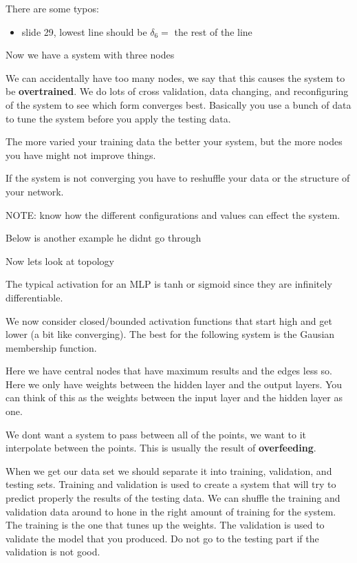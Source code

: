 \documentclass{article}
\begin{document}
There are some typos:
\begin{itemize}
	\item slide 29, lowest line should be $\delta_6 = $ the rest of the line
\end{itemize}





Now we have a system with three nodes

We can accidentally have too many nodes, we say that this causes the system to be \textbf{overtrained}. We do lots of cross validation, data changing, and reconfiguring of the system to see which form converges best. Basically you use a bunch of data to tune the system before you apply the testing data.

The more varied your training data the better your system, but the more nodes you have might not improve things.




If the system is not converging you have to reshuffle your data or the structure of your network.

NOTE: know how the different configurations and values can effect the system.

Below is another example he didnt go through


Now lets look at topology

The typical activation for an MLP is tanh or sigmoid since they are infinitely differentiable.

We now consider closed/bounded activation functions that start high and get lower (a bit like converging). The best for the following system is the Gausian membership function.


Here we have central nodes that have maximum results and the edges less so. Here we only have weights between the hidden layer and the output layers. You can think of this as the weights between the input layer and the hidden layer as one.

We dont want a system to pass between all of the points, we want to it interpolate between the points. This is usually the result of \textbf{overfeeding}.

When we get our data set we should separate it into training, validation, and testing sets. Training and validation is used to create a system that will try to predict properly the results of the testing data. We can shuffle the training and validation data around to hone in the right amount of training for the system. The training is the one that tunes up the weights. The validation is used to validate the model that you produced. Do not go to the testing part if the validation is not good.
\end{document}
